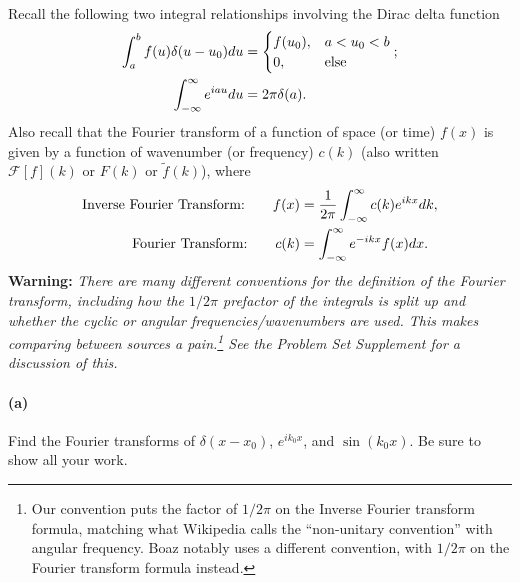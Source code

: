 \documentclass{article}
\begin{document}
\paragraph{}
Recall the following two integral relationships involving the Dirac delta function
	\begin{align}
		\int_{a}^{b} f(u)\delta(u-u_{0}) du &= \begin{cases} f(u_{0}), & a<u_{0}<b\\0,&\mbox{else}\end{cases};	\nonumber\\
		\qquad\quad \int_{-\infty}^{\infty} e^{iau} du &= 2\pi\delta(a). \label{IntegralDelta}
	\end{align}
Also recall that the Fourier transform of a function of space (or time) $f(x)$ is given by a function of wavenumber (or frequency) $c(k)$ (also written $\mathcal{F}[f](k)$ or $F(k)$
or $\widetilde{f}(k)$), where
	\begin{align*}
		\textrm{Inverse Fourier Transform:}\qquad f(x) &=\frac{1}{2\pi}\int_{-\infty}^{\infty} c(k)e^{ikx}dk,					\\		
		\textrm{Fourier Transform:}\qquad c(k) &= \int_{-\infty}^{\infty} e^{-ikx}f(x)dx.		
	\end{align*}
{\bf{Warning:}} \emph{There are many different conventions for the definition of the Fourier transform, including how the $1/2\pi$ prefactor of the integrals is
split up and whether the cyclic or angular frequencies/wavenumbers are used.  This makes comparing between sources a pain.\footnote{Our convention puts the factor of
$1/2\pi$ on the Inverse Fourier transform formula, matching what Wikipedia calls the ``non-unitary convention'' with angular frequency.  Boaz notably uses a different
convention, with $1/2\pi$ on the Fourier transform formula instead.}  
See the Problem Set Supplement for a discussion of this.}

\paragraph{(a)}
Find the Fourier transforms of $\delta(x-x_{0})$, $e^{ik_{0}x}$, and $\sin(k_{0}x)$.  
Be sure to show all your work.\\
\end{document}
